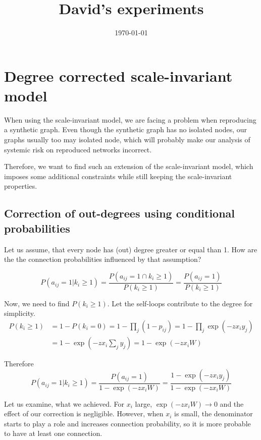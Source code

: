 \documentclass{article}
\title{David's experiments}
\date{\today}
\begin{document}
\maketitle

\section{Degree corrected scale-invariant model}
When using the scale-invariant model, we are facing a problem when reproducing a synthetic graph. Even though the synthetic graph has no isolated nodes, our graphs usually too may isolated node, which will probably make our analysis of systemic risk on reproduced networks incorrect.

Therefore, we want to find such an extension of the scale-invariant model, which imposes some additional constraints while still keeping the scale-invariant properties.

\subsection{Correction of out-degrees using conditional probabilities}
Let us assume, that every node has (out) degree greater or equal than 1. How are the the connection probabilities influenced by that assumption?

\begin{equation}
    P(a_{ij}=1|k_i\geq 1) = \frac{P(a_{ij}=1 \cap k_i\geq1)}{P(k_i\geq1)} = \frac{P(a_{ij}=1)}{P(k_i\geq1)}
\end{equation}

Now, we need to find $P(k_i\geq1)$. Let the self-loops contribute to the degree for simplicity.
\begin{align}
    P(k_i\geq1) &= 1-P(k_i=0) = 1 - \prod_j(1-p_{ij}) = 1 - \prod_j\exp(-zx_i y_j) \\
    &= 1 - \exp(-zx_i\sum_j y_j) = 1 - \exp(-zx_i W)
\end{align}

Therefore
\begin{equation}
    P(a_{ij}=1|k_i\geq 1) = \frac{P(a_{ij}=1)}{1 - \exp(-zx_i W)} = \frac{1-\exp(-zx_iy_j)}{1 - \exp(-zx_i W)}
    \label{eq:posterior_proba}
\end{equation}

Let us examine, what we achieved. For $x_i$ large, $\exp(-z x_i W) \to 0$ and the effect of our correction is negligible. However, when $x_i$ is small, the denominator starts to play a role and increases connection probability, so it is more probable to have at least one connection. 
\end{document}
